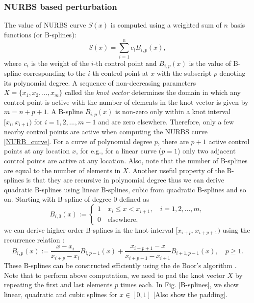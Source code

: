 \documentclass[review]{elsarticle}
\numberwithin{equation}{section}
\numberwithin{equation}{section}
\begin{document}
\subsubsection{NURBS based perturbation}
The value of NURBS curve $S(x)$ is computed using a weighted sum of $n$ basis functions (or B-splines):
\begin{equation}\label{NURB_curve}
S(x) = \sum_{i=1}^{n} c_i B_{i,p}(x),
\end{equation}
where $c_i$ is the weight of the $i$-th control point and $B_{i,p}(x)$ is the value of B-spline corresponding to the $i$-th control point at $x$ with the subscript $p$ denoting its polynomial degree. A sequence of non-decreasing parameters $X = \{x_1,x_2,...,x_m\}$ called the \textit{knot vector} determines the domain in which any control point is active with the number of elements in the knot vector is given by $m = n+p+1$. A B-spline $B_{i,p}(x)$ is non-zero only within a knot interval $[x_i,x_{i+1})$ for $i = 1, 2, ..., m-1$ and are zero elsewhere. Therefore, only a few nearby control points are active when computing the NURBS curve \eqref{NURB_curve}. For a curve of polynomial degree $p$, there are $p+1$ active control points at any location $x$, for e.g., for a linear curve ($p=1$) only two adjacent control points are active at any location. Also, note that the number of B-splines are equal to the number of elements in $X$. Another useful property of the B-splines is that they are recursive in polynomial degree thus we can derive quadratic B-splines using linear B-splines, cubic from quadratic B-splines and so on. Starting with B-spline of degree 0 defined as 
\begin{equation}\label{linearBspline}
B_{i,0}(x) :=
\begin{cases}
1\quad x_i\leq x < x_{i+1},\quad i = 1,2,...,m,\\
0\quad\text{elsewhere,}
\end{cases} 
\end{equation}
we can derive higher order B-splines in the knot interval $[x_{i+p},x_{i+p+1})$ using the recurrence relation \cite{deBoor}:
\begin{equation}\label{NURBS_recurrence}
B_{i,p}(x) := \frac{x - x_i}{x_{i+p} - x_i}B_{i,p-1}(x) + \frac{x_{i+p+1} - x}{x_{i+p+1} - x_{i+1}}B_{i+1,p-1}(x),\quad p\geq1.
\end{equation} 
These B-splines can be constructed efficiently using the de Boor's algorithm \cite{deBoor}. Note that to perform above computation, we need to pad the knot vector $X$ by repeating the first and last elements $p$ times each. In Fig. \ref{B-splines}, we show linear, quadratic and cubic splines for $x\in[0,1]$ [Also show the padding]. 
\end{document}
